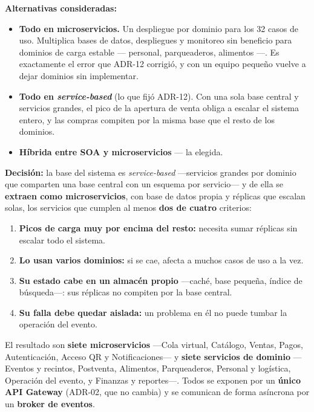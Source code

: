 \textbf{Alternativas consideradas:}
\begin{itemize}
  \item \textbf{Todo en microservicios.} Un despliegue por dominio para los 32
        casos de uso. Multiplica bases de datos, despliegues y monitoreo sin
        beneficio para dominios de carga estable --- personal, parqueaderos,
        alimentos ---. Es exactamente el error que ADR-12 corrigió, y con un
        equipo pequeño vuelve a dejar dominios sin implementar.
  \item \textbf{Todo en \textit{service-based}} (lo que fijó ADR-12). Con una
        sola base central y servicios grandes, el pico de la apertura de venta
        obliga a escalar el sistema entero, y las compras compiten por la misma
        base que el resto de los dominios.
  \item \textbf{Híbrida entre SOA y microservicios} --- la elegida.
\end{itemize}

\textbf{Decisión:} la base del sistema es \textit{service-based} ---servicios
grandes por dominio que comparten una base central con un esquema por
servicio--- y de ella se \textbf{extraen como microservicios}, con base de datos
propia y réplicas que escalan solas, los servicios que cumplen al menos
\textbf{dos de cuatro} criterios:

\begin{enumerate}
  \item \textbf{Picos de carga muy por encima del resto:} necesita sumar
        réplicas sin escalar todo el sistema.
  \item \textbf{Lo usan varios dominios:} si se cae, afecta a muchos casos de
        uso a la vez.
  \item \textbf{Su estado cabe en un almacén propio} ---caché, base pequeña,
        índice de búsqueda---: sus réplicas no compiten por la base central.
  \item \textbf{Su falla debe quedar aislada:} un problema en él no puede tumbar
        la operación del evento.
\end{enumerate}

El resultado son \textbf{siete microservicios} ---Cola virtual, Catálogo,
Ventas, Pagos, Autenticación, Acceso QR y Notificaciones--- y \textbf{siete
servicios de dominio} ---Eventos y recintos, Postventa, Alimentos,
Parqueaderos, Personal y logística, Operación del evento, y Finanzas y
reportes---. Todos se exponen por un \textbf{único API Gateway} (ADR-02, que no
cambia) y se comunican de forma asíncrona por un \textbf{broker de eventos}.

